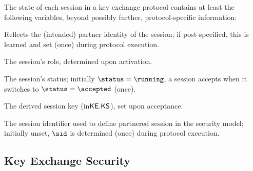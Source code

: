 The state of each session in a key exchange protocol contains at least the following variables, beyond possibly further, protocol-specific information:
\begin{description}
	\setlength{\itemsep}{0.25em} %
	
	\item[$\peerid \in \NN$.]
	Reflects the (intended) partner identity of the session;
	{if post-specified, this is learned and set (once) during protocol execution.}
	
	\item[$\role \in \{\initiator,\responder\}$.]
	The session's role, determined upon activation.
	
	\item[$\status \in \{\running,\accepted,\rejected\}$.]
	The session's status;
	initially $\status = \running$,
	a session accepts when it switches to $\status = \accepted$ (once).
	
	\item[$\skey \in \KEkeyspace$.]
	The derived session key (in$\mathsf{KE}.\mathsf{KS}$), set upon acceptance.
	
	\item[$\sid$.]
	The session identifier used to define partnered session in the security model;
	initially unset, $\sid$ is determined (once) during protocol execution.
\end{description}


\subsection{Key Exchange Security}



